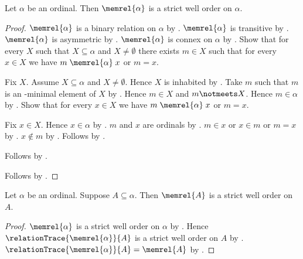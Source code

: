 \begin{theorem}\label{ordinal_membership_is_strict_well_order}
    Let $\alpha$ be an ordinal.
    Then $\memrel{\alpha}$ is a strict well order on $\alpha$.
\end{theorem}
\begin{proof}
    $\memrel{\alpha}$ is a binary relation on $\alpha$
        by .
    $\memrel{\alpha}$ is transitive
        by
        .
    $\memrel{\alpha}$ is asymmetric
        by .
    $\memrel{\alpha}$ is connex on $\alpha$
        by
        .
    Show that for every $X$ such that $X\subseteq\alpha$ and
        $X\neq\emptyset$ there exists $m\in X$ such that for every
        $x\in X$ we have $m\mathrel{\memrel{\alpha}}x$ or $m=x$.
    \begin{subproof}
        Fix $X$.
        Assume $X\subseteq\alpha$ and $X\neq\emptyset$.
        Hence $X$ is inhabited by .
        Take $m$ such that $m$ is an \in-minimal element of $X$
            by .
        Hence $m\in X$ and $m\notmeets X$.
        Hence $m\in\alpha$ by .
        Show that for every $x\in X$ we have
            $m\mathrel{\memrel{\alpha}}x$ or $m=x$.
        \begin{subproof}
            Fix $x\in X$.
            Hence $x\in\alpha$ by .
            $m$ and $x$ are ordinals
                by .
            $m\in x$ or $x\in m$ or $m=x$
                by .
            $x\notin m$ by .
            Follows by .
        \end{subproof}
        Follows by \auto.
    \end{subproof}
    Follows by .
\end{proof}

\begin{theorem}\label{ordinal_subset_strict_well_order}
    Let $\alpha$ be an ordinal.
    Suppose $A\subseteq\alpha$.
    Then $\memrel{A}$ is a strict well order on $A$.
\end{theorem}
\begin{proof}
    $\memrel{\alpha}$ is a strict well order on $\alpha$ by
        .
    Hence $\relationTrace{\memrel{\alpha}}{A}$ is a strict well order
        on $A$ by .
    $\relationTrace{\memrel{\alpha}}{A}=\memrel{A}$ by
        .
\end{proof}

